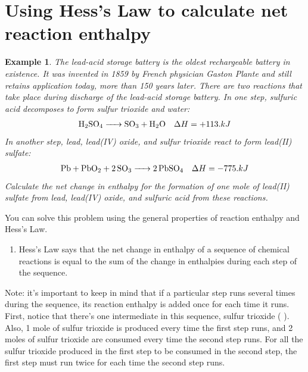 \documentclass{article}  %
\newtheorem{exmp}{Example}
\begin{document}
\section*{Using Hess's Law to calculate net reaction enthalpy}
\begin{exmp}
    The lead-acid storage battery is the oldest rechargeable battery in existence. It was invented in 1859 by French physician Gaston Plante and still retains application today, more than 150 years later. 
    There are two reactions that take place during discharge of the lead-acid storage battery. In one step, sulfuric acid decomposes to form sulfur trioxide and water: 
    \begin{equation*}
        \begin{aligned}
            \ce{H2SO4 -> SO3 + H2O} \quad \Delta H = + 113. kJ \\
        \end{aligned}
    \end{equation*}
    In another step, lead, lead(IV) oxide, and sulfur trioxide react to form lead(II) sulfate: 
    \begin{equation*}
        \begin{aligned}
            \ce{Pb + PbO2 + 2 SO3 -> 2 PbSO4} \quad \Delta H = -775. kJ 
        \end{aligned}
    \end{equation*}
    Calculate the net change in enthalpy for the formation of \emph{one mole} of lead(II) sulfate from lead, lead(IV) oxide, and sulfuric acid from these reactions.  
\end{exmp}
You can solve this problem using the general properties of reaction enthalpy and Hess's Law. 
\begin{enumerate}
    \item Hess's Law says that the net change in enthalpy of a sequence of chemical reactions is equal to the sum of the change in enthalpies during each step of the sequence. 
\end{enumerate}
Note: it's important to keep in mind that if a particular step runs several times during the sequence, its reaction enthalpy is added once for each time it runs. 
First, notice that there's one intermediate in this sequence, sulfur trioxide (
). Also, 1 mole of sulfur trioxide is produced every time the first step runs, and 2 moles of sulfur trioxide are consumed every time the second step runs. For all the sulfur trioxide produced in the first step to be consumed in the second step, the first step must run twice for each time the second step runs. 
\end{document}
